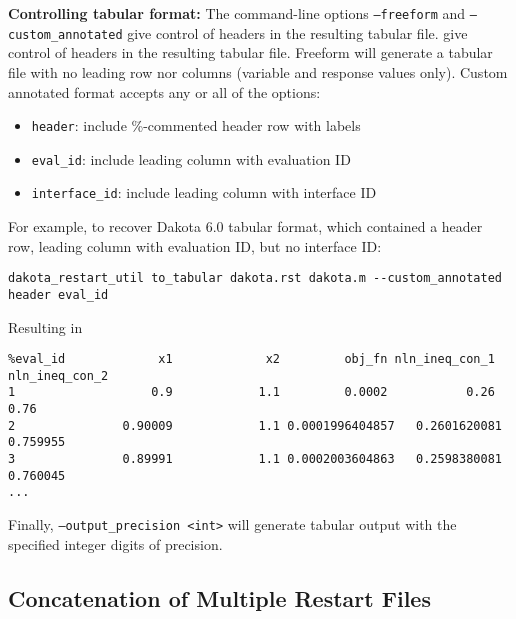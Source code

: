 \textbf{Controlling tabular format:} The command-line options
\texttt{--freeform} and \texttt{--custom\_annotated} give control of
headers in the resulting tabular file.  give control of headers in the
resulting tabular file.  Freeform will generate a tabular file with no
leading row nor columns (variable and response values only).  Custom
annotated format accepts any or all of the options:
\begin{itemize}
\item {\tt header}: include \%-commented header row with labels
\item {\tt eval\_id}: include leading column with evaluation ID
\item {\tt interface\_id}: include leading column with interface ID
\end{itemize}
For example, to recover Dakota 6.0 tabular format, which contained a
header row, leading column with evaluation ID, but no interface ID:
\begin{footnotesize}
\begin{verbatim}
dakota_restart_util to_tabular dakota.rst dakota.m --custom_annotated header eval_id
\end{verbatim}
\end{footnotesize}
Resulting in
\begin{footnotesize}
\begin{verbatim}
%eval_id             x1             x2         obj_fn nln_ineq_con_1 nln_ineq_con_2 
1                   0.9            1.1         0.0002           0.26           0.76 
2               0.90009            1.1 0.0001996404857   0.2601620081       0.759955 
3               0.89991            1.1 0.0002003604863   0.2598380081       0.760045 
...
\end{verbatim}
\end{footnotesize}

Finally, \texttt{--output\_precision <int>} will generate tabular
output with the specified integer digits of precision.

\subsection{Concatenation of Multiple Restart Files}\label{restart:utility:concatenation}

